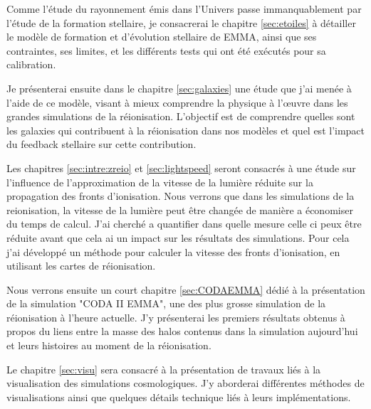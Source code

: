 Comme l'étude du rayonnement émis dans l'Univers passe immanquablement par l'étude de la formation stellaire, je consacrerai le chapitre \ref{sec:etoiles} à détailler le modèle de formation et d'évolution stellaire de EMMA, ainsi que ses contraintes, ses limites, et les différents tests qui ont été exécutés pour sa calibration.

Je présenterai ensuite dans le chapitre \ref{sec:galaxies} une étude que j'ai menée à l'aide de ce modèle, visant à mieux comprendre la physique à l'œuvre dans les grandes simulations de la réionisation.
L'objectif est de comprendre quelles sont les galaxies qui contribuent à la réionisation dans nos modèles et quel est l'impact du feedback stellaire sur cette contribution.

Les chapitres \ref{sec:intre:zreio} et \ref{sec:lightspeed} seront consacrés à une étude sur l'influence de l'approximation de la vitesse de la lumière réduite sur la propagation des fronts d'ionisation.
Nous verrons que dans les simulations de la reionisation, la vitesse de la lumière peut être changée de manière a économiser du temps de calcul.
J'ai cherché a quantifier dans quelle mesure celle ci peux être réduite avant que cela ai un impact sur les résultats des simulations.
Pour cela j'ai développé un méthode pour calculer la vitesse des fronts d'ionisation, en utilisant les cartes de réionisation.

Nous verrons ensuite un court chapitre \ref{sec:CODAEMMA} dédié à la présentation de la simulation "CODA II EMMA", une des plus grosse simulation de la réionisation à l'heure actuelle.
J'y présenterai les premiers résultats obtenus à propos du liens entre la masse des halos contenus dans la simulation aujourd'hui et leurs histoires au moment de la réionisation.

Le chapitre \ref{sec:visu} sera consacré à la présentation de travaux liés à la visualisation des simulations cosmologiques.
J'y aborderai différentes méthodes de visualisations ainsi que quelques détails technique liés à leurs implémentations.



